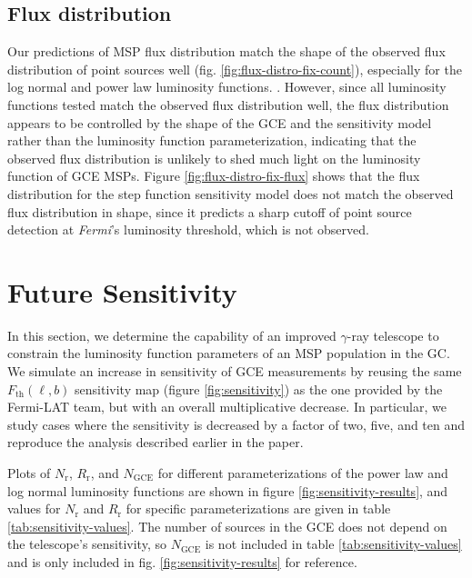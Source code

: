 \documentclass[a4paper,11pt]{article}
\newcommand{\comment}[1]{\emph{\color{red}{#1}}}
\begin{document}
\subsection{Flux distribution}
Our predictions of MSP flux distribution match the shape of the observed flux distribution of point sources well (fig. \ref{fig:flux-distro-fix-count}), especially for the log normal and power law luminosity functions. \comment{Should I make some Poissonian error bars and find a p value?}. However, since all luminosity functions tested match the observed flux distribution well, the flux distribution appears to be controlled by the shape of the GCE and the sensitivity model rather than the luminosity function parameterization, indicating that the observed flux distribution is unlikely to shed much light on the luminosity function of GCE MSPs. \comment{Is that too unsubstantiated to say?} Figure \ref{fig:flux-distro-fix-flux} shows that the flux distribution for the step function sensitivity model does not match the observed flux distribution in shape, since it predicts a sharp cutoff of point source detection at \textit{Fermi}'s luminosity threshold, which is not observed.





\section{Future Sensitivity}
In this section, we determine the capability of an improved $\gamma$-ray telescope to constrain the luminosity function parameters of an MSP population in the GC. We simulate an increase in sensitivity of GCE measurements by reusing the same $F_\text{th}(\ell, b)$ sensitivity map (figure \ref{fig:sensitivity}) as the one provided by the Fermi-LAT team, but with an overall multiplicative decrease. In particular, we study cases where the sensitivity is decreased by a factor of two, five, and ten and reproduce the analysis described earlier in the paper.

Plots of $N_\text{r}$, $R_\text{r}$, and $N_\text{GCE}$ for different parameterizations of the power law and log normal luminosity functions are shown in figure \ref{fig:sensitivity-results}, and values for $N_\text{r}$ and $R_\text{r}$ for specific parameterizations are given in table \ref{tab:sensitivity-values}. The number of sources in the GCE does not depend on the telescope's sensitivity, so $N_\text{GCE}$ is not included in table \ref{tab:sensitivity-values} and is only included in fig. \ref{fig:sensitivity-results} for reference. \comment{That means that the backgrounds of the column plots do not change from plot to plot. I could put them all on the same axes.}
\end{document}
